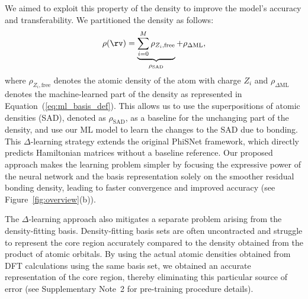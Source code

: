 \documentclass[12pt]{article}
\begin{document}
We aimed to exploit this property of the density to improve the model's accuracy and transferability. We partitioned the density as follows:
\begin{equation}\label{eq:delta_rho}
\rho(\rv) = \underbrace{\sum_{i=0}^M \rho_{Z_i, \mathrm{free}}}_{\rho_{\mathrm{SAD}}} + \rho_{\Delta\mathrm{ML}},
\end{equation}
where $\rho_{Z_i, \mathrm{free}}$ denotes the atomic density of the atom with charge $Z_i$ and $\rho_{\Delta\mathrm{ML}}$ denotes the machine-learned part of the density as represented in Equation~(\ref{eq:ml_basis_def}). This allows us to use the superpositions of atomic densities (SAD), denoted as $\rho_{\mathrm{SAD}}$, as a baseline for the unchanging part of the density, and use our ML model to learn the changes to the SAD due to bonding. This $\Delta$-learning strategy extends the original PhiSNet framework,\citep{unke2021se} which directly predicts Hamiltonian matrices without a baseline reference. Our proposed approach makes the learning problem simpler by focusing the expressive power of the neural network and the basis representation solely on the smoother residual bonding density, leading to faster convergence and improved accuracy (see Figure~\ref{fig:overview}(b)).~\cite{huang2025active}

The $\Delta$-learning approach also mitigates a separate problem arising from the density-fitting basis. Density-fitting basis sets are often uncontracted and struggle to represent the core region accurately compared to the density obtained from the product of atomic orbitals. By using the actual atomic densities obtained from DFT calculations using the same basis set, we obtained an accurate representation of the core region, thereby eliminating this particular source of error (see Supplementary Note~2 for pre-training procedure details).
\end{document}
